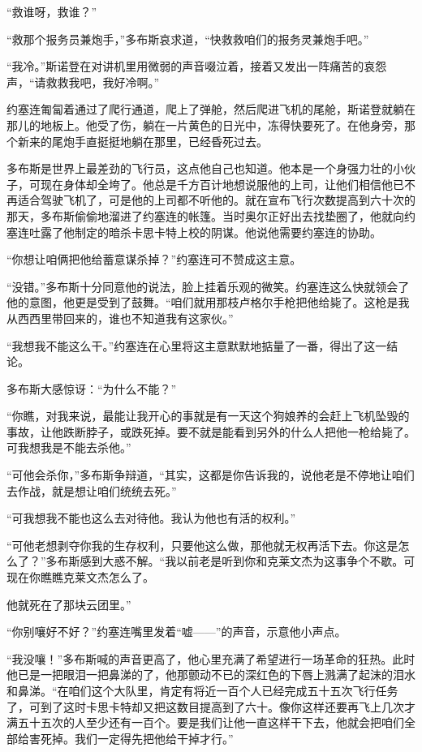     “救谁呀，救谁？”

    “救那个报务员兼炮手，”多布斯哀求道，“快救救咱们的报务灵兼炮手吧。”

    “我冷。”斯诺登在对讲机里用微弱的声音啜泣着，接着又发出一阵痛苦的哀怨声，“请救救我吧，我好冷啊。”

    约塞连匍匐着通过了爬行通道，爬上了弹舱，然后爬进飞机的尾舱，斯诺登就躺在那儿的地板上。他受了伤，躺在一片黄色的日光中，冻得快要死了。在他身旁，那个新来的尾炮手直挺挺地躺在那里，已经昏死过去。

    多布斯是世界上最差劲的飞行员，这点他自己也知道。他本是一个身强力壮的小伙子，可现在身体却全垮了。他总是千方百计地想说服他的上司，让他们相信他已不再适合驾驶飞机了，可是他的上司都不听他的。就在宣布飞行次数提高到六十次的那天，多布斯偷偷地溜进了约塞连的帐篷。当时奥尔正好出去找垫圈了，他就向约塞连吐露了他制定的暗杀卡思卡特上校的阴谋。他说他需要约塞连的协助。

    “你想让咱俩把他给蓄意谋杀掉？”约塞连可不赞成这主意。

    “没错。”多布斯十分同意他的说法，脸上挂着乐观的微笑。约塞连这么快就领会了他的意图，他更是受到了鼓舞。“咱们就用那枝卢格尔手枪把他给毙了。这枪是我从西西里带回来的，谁也不知道我有这家伙。”

    “我想我不能这么干。”约塞连在心里将这主意默默地掂量了一番，得出了这一结论。

    多布斯大感惊讶：“为什么不能？”

    “你瞧，对我来说，最能让我开心的事就是有一天这个狗娘养的会赶上飞机坠毁的事故，让他跌断脖子，或跌死掉。要不就是能看到另外的什么人把他一枪给毙了。可我想我是不能去杀他。”

    “可他会杀你，”多布斯争辩道，“其实，这都是你告诉我的，说他老是不停地让咱们去作战，就是想让咱们统统去死。”

    “可我想我不能也这么去对待他。我认为他也有活的权利。”

    “可他老想剥夺你我的生存权利，只要他这么做，那他就无权再活下去。你这是怎么了？”多布斯感到大惑不解。“我以前老是听到你和克莱文杰为这事争个不歇。可现在你瞧瞧克莱文杰怎么了。

    他就死在了那块云团里。”

    “你别嚷好不好？”约塞连嘴里发着“嘘——”的声音，示意他小声点。

    “我没嚷！”多布斯喊的声音更高了，他心里充满了希望进行一场革命的狂热。此时他已是一把眼泪一把鼻涕的了，他那颤动不已的深红色的下唇上溅满了起沫的泪水和鼻涕。“在咱们这个大队里，肯定有将近一百个人已经完成五十五次飞行任务了，可到了这时卡思卡特却又把这数目提高到了六十。像你这样还要再飞上几次才满五十五次的人至少还有一百个。要是我们让他一直这样干下去，他就会把咱们全部给害死掉。我们一定得先把他给干掉才行。”

